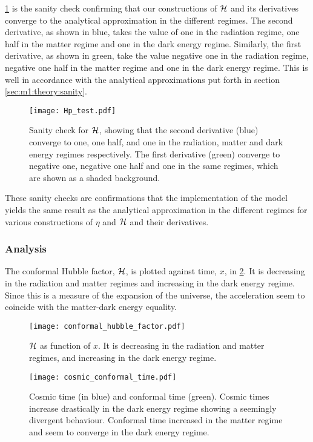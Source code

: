     \cref{fig:m1:Hp_tests} is the sanity check confirming that our constructions of $\mathcal{H}$ and its derivatives converge to the analytical approximation in the different regimes. The second derivative, as shown in blue, takes the value of one in the radiation regime, one half in the matter regime and one in the dark energy regime. Similarly, the first derivative, as shown in green, take the value negative one in the radiation regime, negative one half in the matter regime and one in the dark energy regime. This is well in accordance with the analytical approximations put forth in section \cref{sec:m1:theory:sanity}. 

    \begin{figure}
        \texttt{[image: Hp\_test.pdf]}
        \caption{Sanity check for $\mathcal{H}$, showing that the second derivative (blue) converge to one, one half, and one in the radiation, matter and dark energy regimes respectively. The first derivative (green) converge to negative one, negative one half and one in the same regimes, which are shown as a shaded background.}
        \label{fig:m1:Hp_tests}
    \end{figure}

    These sanity checks are confirmations that the implementation of the model yields the same result as the analytical approximation in the different regimes for various constructions of $\eta$ and $\mathcal{H}$ and their derivatives.

\subsubsection{Analysis}

    The conformal Hubble factor, $\mathcal{H}$, is plotted against time, $x$, in \cref{fig:m1:conformal_hubble_factor_Hp}. It is decreasing in the radiation and matter regimes and increasing in the dark energy regime. Since this is a measure of the expansion of the universe, the acceleration seem to coincide with the matter-dark energy equality. 
    \begin{figure}
        \texttt{[image: conformal\_hubble\_factor.pdf]}
        \caption{$\mathcal{H}$ as function of $x$. It is decreasing in the radiation and matter regimes, and increasing in the dark energy regime.}
        \label{fig:m1:conformal_hubble_factor_Hp}
    \end{figure}

    \begin{figure}
        \texttt{[image: cosmic\_conformal\_time.pdf]}
        \caption{Cosmic time (in blue) and conformal time (green). Cosmic times increase drastically in the dark energy regime showing a seemingly divergent behaviour. Conformal time increased in the matter regime and seem to converge in the dark energy regime.}
        \label{fig:m1:cosmic_conformal_time}
    \end{figure}

